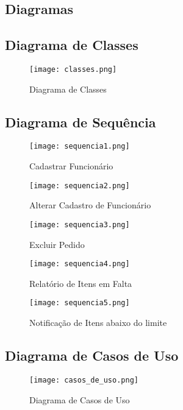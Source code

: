 \begin{landscape}
\section{Diagramas}\label{diagramas}

\subsection{Diagrama de Classes}
\begin{figure}[htb]
	\centering
	\texttt{[image: classes.png]}
	\caption{Diagrama de Classes}
\end{figure}



\subsection{Diagrama de Sequência}
\begin{figure}[htb]
	\centering
	\texttt{[image: sequencia1.png]}
	\caption{Cadastrar Funcionário}
\end{figure}

\begin{figure}[htb]
	\centering
	\texttt{[image: sequencia2.png]}
	\caption{Alterar Cadastro de Funcionário}
\end{figure}

\begin{figure}[htb]
	\centering
	\texttt{[image: sequencia3.png]}
	\caption{Excluir Pedido}
\end{figure}

\begin{figure}[htb]
	\centering
	\texttt{[image: sequencia4.png]}
	\caption{Relatório de Itens em Falta}
\end{figure}

\begin{figure}[htb]
	\centering
	\texttt{[image: sequencia5.png]}
	\caption{Notificação de Itens abaixo do limite}
\end{figure}

\clearpage

\subsection{Diagrama de Casos de Uso}
\begin{figure}[htb]
	\centering
	\texttt{[image: casos\_de\_uso.png]}
	\caption{Diagrama de Casos de Uso}
\end{figure}
\end{landscape}